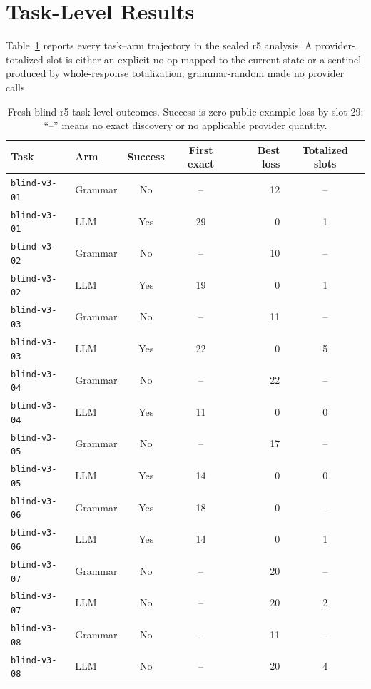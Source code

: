 \documentclass[twoside,11pt]{article}
\begin{document}
\section{Task-Level Results}
\label{app:task-results}

Table~\ref{tab:r5-task-results} reports every task--arm trajectory in the sealed
r5 analysis. A provider-totalized slot is either an explicit no-op mapped to the
current state or a sentinel produced by whole-response totalization;
grammar-random made no provider calls.

\begin{table}[!htbp]
\centering
\footnotesize
\renewcommand{\arraystretch}{0.88}
\setlength{\tabcolsep}{3pt}
\caption{Fresh-blind r5 task-level outcomes. Success is zero public-example
loss by slot 29; ``--'' means no exact discovery or no applicable provider
quantity.}
\label{tab:r5-task-results}
\begin{tabular}{@{}llccrc@{}}
\toprule
Task & Arm & Success & First exact & Best loss & Totalized slots \\
\midrule
\texttt{blind-v3-01} & Grammar & No  & -- & 12 & -- \\
\texttt{blind-v3-01} & LLM     & Yes & 29 &  0 & 1 \\
\texttt{blind-v3-02} & Grammar & No  & -- & 10 & -- \\
\texttt{blind-v3-02} & LLM     & Yes & 19 &  0 & 1 \\
\texttt{blind-v3-03} & Grammar & No  & -- & 11 & -- \\
\texttt{blind-v3-03} & LLM     & Yes & 22 &  0 & 5 \\
\texttt{blind-v3-04} & Grammar & No  & -- & 22 & -- \\
\texttt{blind-v3-04} & LLM     & Yes & 11 &  0 & 0 \\
\texttt{blind-v3-05} & Grammar & No  & -- & 17 & -- \\
\texttt{blind-v3-05} & LLM     & Yes & 14 &  0 & 0 \\
\texttt{blind-v3-06} & Grammar & Yes & 18 &  0 & -- \\
\texttt{blind-v3-06} & LLM     & Yes & 14 &  0 & 1 \\
\texttt{blind-v3-07} & Grammar & No  & -- & 20 & -- \\
\texttt{blind-v3-07} & LLM     & No  & -- & 20 & 2 \\
\texttt{blind-v3-08} & Grammar & No  & -- & 11 & -- \\
\texttt{blind-v3-08} & LLM     & No  & -- & 20 & 4 \\

\end{tabular}
\end{table}
\end{document}
